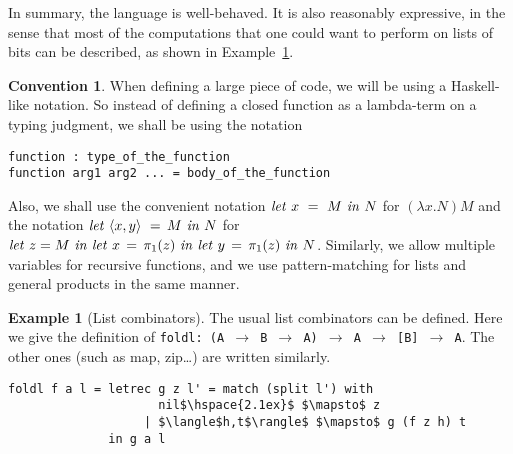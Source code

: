 \documentclass{article}
\theoremstyle{plain}
\theoremstyle{definition}
\newtheorem{convention}[theorem]{Convention}
\newtheorem{example}[theorem]{Example}
\newcommand{\lettermx}[3]{{{\it let}~{#1}~=~{#2}~{\it in}~{#3}}}
\newcommand{\letprodterm}[3]{{{\it let}~\prodterm{#1}~=~{#2}~{\it in}~{#3}}}
\begin{document}
In summary, the language is well-behaved. It is also reasonably
expressive, in the sense that most of the computations that one could
want to perform on lists of bits can be described, as shown in
Example~\ref{ex:list}.

\begin{convention}\rm
  When defining a large piece of code, we will be using a Haskell-like
  notation. So instead of defining a closed function as a lambda-term
  on a typing judgment, we shall be using the notation
\begin{Verbatim}[fontsize=\relsize{-2}]
function : type_of_the_function
function arg1 arg2 ... = body_of_the_function
\end{Verbatim}
Also, we shall use the convenient notation $\lettermx{x}{M}{N}$ for
$(\lambda x.N)M$ and the notation $\letprodterm{x,y}{\!M}{N}$ for
$\lettermx{z\!\!}{\!\!M}{\lettermx{x\!}{\!\pi_1(z)}{\lettermx{y\!}{\!\pi_1(z)}{N}}}$.
Similarly, we allow multiple variables for recursive functions, and we
use pattern-matching for lists and general products in the same
manner.
\end{convention}

\begin{example}[List combinators]\label{ex:list}
  The usual list combinators can be defined. 
Here we give the definition of {\tt foldl: (A $\to$ B $\to$ A) $\to$ A
  $\to$ [B] $\to$ A}. The other ones (such as map, zip\ldots) are written
similarly.
\begin{Verbatim}[fontsize=\relsize{-2},commandchars=\\\{\},
  codes={\catcode`$=3\catcode`^=7}]
foldl f a l = letrec g z l' = match (split l') with 
                     nil$\hspace{2.1ex}$ $\mapsto$ z
                   | $\langle$h,t$\rangle$ $\mapsto$ g (f z h) t
              in g a l
\end{Verbatim}
\end{example}
\end{document}
